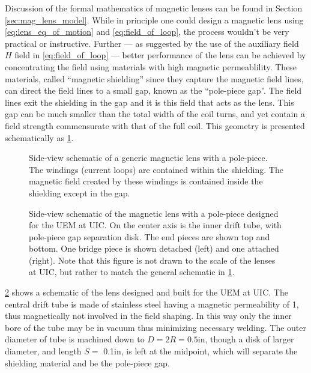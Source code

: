 Discussion of the formal mathematics of magnetic lenses can be found in Section \ref{sec:mag_lens_model}.
While in principle one could design a magnetic lens using \ref{eq:lens_eq_of_motion} and \ref{eq:field_of_loop}, the process wouldn't be very practical or instructive.
Further --- as suggested by the use of the auxiliary field $H$ field in \ref{eq:field_of_loop} --- better performance of the lens can be achieved by concentrating the field using materials with high magnetic permeablility.
These materials, called ``magnetic shielding'' since they capture the magnetic field lines, can direct the field lines to a small gap, known as the ``pole-piece gap''.
The field lines exit the shielding in the gap and it is this field that acts as the lens.
This gap can be much smaller than the total width of the coil turns, and yet contain a field strength commensurate with that of the full coil.
This geometry is presented schematically as \ref{fig:polepiece-schematic}.

\begin{figure}
  \centering
  
  \caption[Schematic of a generic magnetic lens with a pole-piece]{
    Side-view schematic of a generic magnetic lens with a pole-piece.
    The windings (current loops) are contained within the shielding.
    The magnetic field created by these windings is contained inside the shielding except in the gap.
  }
  \label{fig:polepiece-schematic}
\end{figure}

\begin{figure}
  \centering
  
  \caption[Design schematic of our magnetic lens with a pole-piece]{
    Side-view schematic of the magnetic lens with a pole-piece designed for the UEM at UIC.
    On the center axis is the inner drift tube, with pole-piece gap separation disk.
    The end pieces are shown top and bottom.
    One bridge piece is shown detached (left) and one attached (right).
    Note that this figure is not drawn to the scale of the lenses at UIC, but rather to match the general schematic in \ref{fig:polepiece-schematic}.
  }
  \label{fig:polepiece-design}
\end{figure}

\ref{fig:polepiece-design} shows a schematic of the lens designed and built for the UEM at UIC.
The central drift tube is made of stainless steel having a magnetic permeability of 1, thus magnetically not involved in the field shaping.
In this way only the inner bore of the tube may be in vacuum thus minimizing necessary welding.
The outer diameter of tube is machined down to $ D = 2R = 0.5 \text{in}$, though a disk of larger diameter, and length $ S = $ 0.1in, is left at the midpoint, which will separate the shielding material and be the pole-piece gap.

